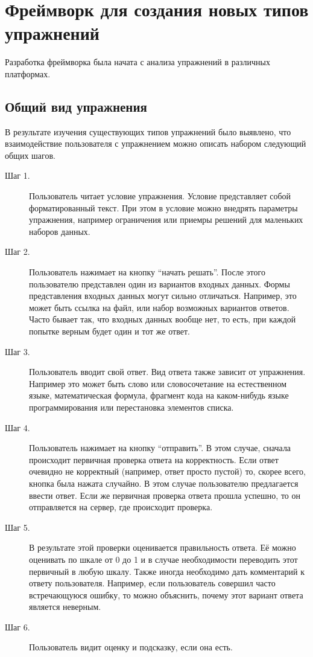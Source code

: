 \documentclass{matmex-diploma-custom}
\begin{document}
\section{Фреймворк для создания новых типов упражнений}
Разработка фреймворка была начата с анализа упражнений в различных
платформах.

\subsection{Общий вид упражнения}
В результате изучения существующих типов упражнений было
выявлено, что взаимодействие пользователя с упражнением можно описать
набором следующий общих шагов.

\begin{description}
\item[Шаг 1.] Пользователь читает условие упражнения. Условие
  представляет собой форматированный текст. При этом в условие можно
  внедрять параметры упражнения, например ограничения или приемры
  решений для маленьких наборов данных.

\item[Шаг 2.] Пользователь нажимает на кнопку ``начать решать''.
  После этого пользователю представлен один из вариантов входных
  данных. Формы представления входных данных могут сильно
  отличаться. Например, это может быть ссылка на файл, или
  набор возможных вариантов ответов. Часто бывает так, что входных
  данных вообще нет, то есть, при каждой попытке верным будет один и тот
  же ответ.
\item[Шаг 3.] Пользователь вводит свой ответ. Вид ответа также
  зависит от упражнения. Например это может быть слово или
  словосочетание на естественном языке, математическая формула, фрагмент
  кода на каком-нибудь языке программирования или перестановка элементов
  списка.
\item[Шаг 4.] Пользователь нажимает на кнопку ``отправить''. В этом
  случае, сначала происходит первичная проверка ответа на
  корректность. Если ответ очевидно не корректный (например, ответ
  просто пустой) то, скорее всего, кнопка была нажата случайно. В этом
  случае пользователю предлагается ввести ответ. Если же первичная
  проверка ответа прошла успешно, то он отправляется на сервер, где
  происходит проверка.
\item[Шаг 5.] В результате этой проверки оценивается правильность
  ответа. Её можно оценивать по шкале от 0 до 1 и в случае необходимости
  переводить этот первичный в любую шкалу. Также иногда необходимо дать
  комментарий к ответу пользователя. Например, если пользователь
  совершил часто встречающуюся ошибку, то можно объяснить, почему этот
  вариант ответа является неверным.
\item[Шаг 6.] Пользователь видит оценку и подсказку, если она есть.
\end{description}
\end{document}
